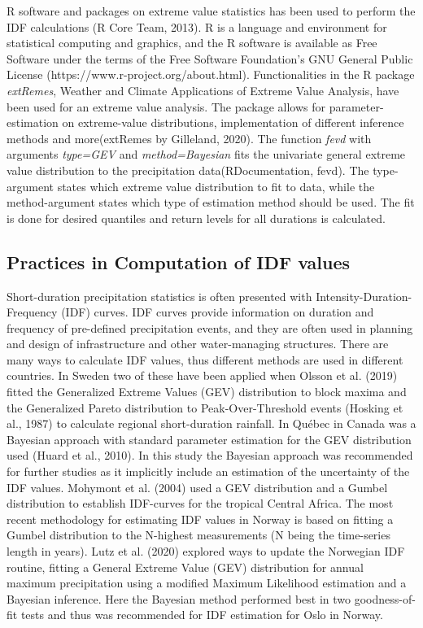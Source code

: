 \documentclass[12pt]{article}
\begin{document}
{R software and packages on extreme value statistics has been used to perform the IDF calculations (R Core Team, 2013). R is a language and environment for statistical computing and graphics, and the R software is available as Free Software under the terms of the Free Software Foundation's GNU General Public License (https://www.r-project.org/about.html). Functionalities in the R package \textit{extRemes}, Weather and Climate Applications of Extreme Value Analysis, have been used for an extreme value analysis. The package allows for parameter-estimation on extreme-value distributions, implementation of different inference methods and more(extRemes by Gilleland, 2020). The function \textit{fevd} with arguments \textit{type=GEV} and \textit{method=Bayesian} fits the univariate general extreme value distribution to the precipitation data(RDocumentation, fevd). The type-argument states which extreme value distribution to fit to data, while the method-argument states which type of estimation method should be used. The fit is done for desired quantiles and return levels for all durations is calculated.  

 

\subsection{Practices in Computation of IDF values}

Short-duration precipitation statistics is often presented with Intensity-Duration-Frequency (IDF) curves. IDF curves provide information on duration and frequency of pre-defined precipitation events, and they are often used in planning and design of infrastructure and other water-managing structures. There are many ways to calculate IDF values, thus different methods are used in different countries. In Sweden two of these have been applied when Olsson et al. (2019) fitted the Generalized Extreme Values (GEV) distribution to block maxima and the Generalized Pareto distribution to Peak-Over-Threshold events (Hosking et al., 1987) to calculate regional short-duration rainfall. In Québec in Canada was a Bayesian approach with standard parameter estimation for the GEV distribution used (Huard et al., 2010). In this study the Bayesian approach was recommended for further studies as it implicitly include an estimation of the uncertainty of the IDF values. Mohymont et al. (2004) used a GEV distribution and a Gumbel distribution to establish IDF-curves for the tropical Central Africa. The most recent methodology for estimating IDF values in Norway is based on fitting a Gumbel distribution to the N-highest measurements (N being the time-series length in years). Lutz et al. (2020) explored ways to update the Norwegian IDF routine, fitting a General Extreme Value (GEV) distribution for annual maximum precipitation using a modified Maximum Likelihood estimation and a Bayesian inference. Here the Bayesian method performed best in two goodness-of-fit tests and thus was recommended for IDF estimation for Oslo in Norway.

}
\end{document}
